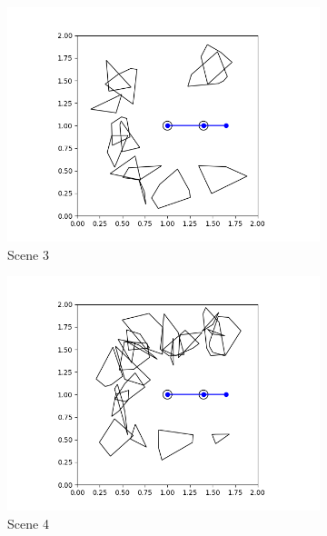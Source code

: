 \documentclass{article}
\begin{document}
\begin{figure}[h!]
\begin{subfigure}{0.45\textwidth}
        \includegraphics[width=\textwidth]{polygon_scene3.png}
        \caption{Scene 3}
    \end{subfigure}
    \hfill
    \begin{subfigure}{0.45\textwidth}
        \includegraphics[width=\textwidth]{polygon_scene4.png}
        \caption{Scene 4}
    \end{subfigure}
    \\
    \begin{subfigure}{0.45\textwidth}

\end{subfigure}
\end{figure}
\end{document}
